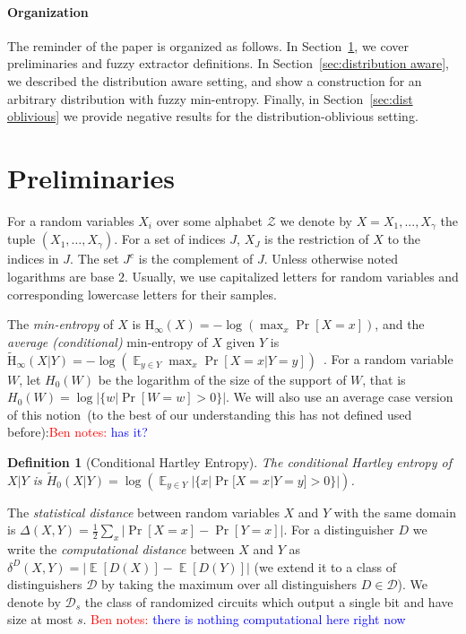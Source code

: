 \documentclass[11pt]{article}
\newcommand{\secref}[1]{\mbox{Section~\ref{#1}}}
\DeclareMathOperator*{\expe}{\mathbb{E}}
\newcommand{\Hoo}{\mathrm{H}_\infty}
\newcommand{\Hav}{\tilde{\mathrm{H}}_\infty}
\newtheorem{definition}[theorem]{Definition}
\newcommand{\authnote}[2]{{\textcolor{red}{\textsf{#1 notes: }\textcolor{blue}{ #2}}\marginpar{\textcolor{red}{\textbf{!!!!!}}}}}
\newcommand{\authnote}[2]{}
\newcommand{\bnote}[1]{{\authnote{Ben}{#1}}}
\begin{document}
\paragraph{Organization} The reminder of the paper is organized as follows.  In \secref{sec:preliminaries}, we cover preliminaries and fuzzy extractor definitions.  In \secref{sec:distribution aware}, we described the distribution aware setting, and show a construction for an arbitrary distribution with fuzzy min-entropy.  Finally, in \secref{sec:dist oblivious} we provide negative results for the distribution-oblivious setting.

\section{Preliminaries}
\label{sec:preliminaries}
For a random variables $X_i$ over some alphabet $\mathcal{Z}$ we denote by $X = X_1,..., X_\gamma$  the tuple $(X_1,\dots, X_\gamma)$.  For a set of indices $J$, $X_{J}$ is the restriction of $X$ to the indices in $J$.  The set $J^c$ is the complement of $J$.  Unless otherwise noted logarithms are base $2$.
Usually, we use capitalized letters for random variables and corresponding lowercase letters for their samples.

The {\em min-entropy} of $X$ is $\Hoo(X) = -\log(\max_x \Pr[X=x])$,
and the {\em average (conditional)} min-entropy of $X$ given $Y$ is  $\Hav(X|Y) = -\log(\expe_{y\in Y} \max_{x} \Pr[X=x|Y=y])$~\cite[Section 2.4]{DBLP:journals/siamcomp/DodisORS08}.   For a random variable $W$, let $H_0(W)$ be the logarithm of the size of the support of $W$,  that is $H_0(W) = \log |\{w | \Pr[W=w]>0\}|$.  We will also use an average case version of this notion~(to the best of our understanding this has not defined used before):\bnote{has it?}
\begin{definition}[Conditional Hartley Entropy]
\label{def:conditional hartley}
The conditional Hartley entropy of $X |Y $ is $\tilde{H}_0(X |Y) = \log ( \expe_{y\in Y} |\{x | \Pr[X=x |Y=y]>0\}|)$.
\end{definition}
The {\em statistical distance} between random variables $X$ and $Y$ with the same domain is $\Delta(X,Y) = \frac12 \sum_x |\Pr[X=x] - \Pr[Y=x]|$.
For a distinguisher $D$ we write the \emph{computational distance} between $X$ and $Y$ as $\delta^D(X,Y) = \left| \expe[D(X)]-\expe[D(Y)]\right |$ (we extend it to a class of distinguishers $\mathcal{D}$ by taking the maximum over all distinguishers $D\in\mathcal{D}$).  We denote by $\mathcal{D}_{s}$ the class of randomized circuits which output a single bit and have size at most $s$. \bnote{there is nothing computational here right now}
\end{document}
